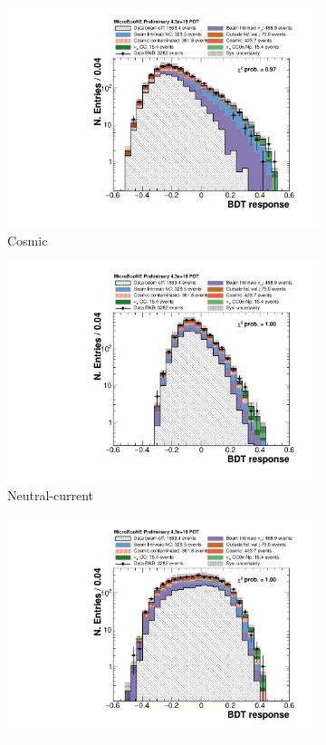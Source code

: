 \begin{figure}[htbp]
\centering
  \begin{subfigure}{0.32\textwidth}
    \includegraphics[width=\linewidth]{figures/bdt_cosmic.pdf}
    \caption{Cosmic} 
  \end{subfigure}\begin{subfigure}{0.32\textwidth}
    \includegraphics[width=\linewidth]{figures/bdt_nc.pdf}
    \caption{Neutral-current}
  \end{subfigure}\begin{subfigure}{0.32\textwidth}
    \includegraphics[width=\linewidth]{figures/bdt_numu.pdf}

\end{subfigure}
\end{figure}
